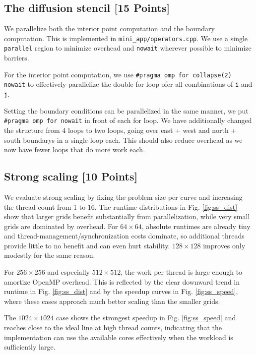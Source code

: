 \documentclass[unicode,10pt,a4paper,oneside,numbers=endperiod,openany]{scrartcl}
\begin{document}
\subsection{The diffusion stencil [15 Points]}\label{sec:diff_par}  We parallelize both the interior point computation and the boundary computation. This is implemented in \texttt{mini\_app/operators.cpp}. We use a single \texttt{parallel} region to minimize overhead and \texttt{nowait} wherever possible to minimize barriers.

For the interior point computation, we use \texttt{\#pragma omp for collapse(2) nowait} to effectively parallelize the double for loop ofer all combinations of \texttt{i} and \texttt{j}.

Setting the boundary conditions can be parallelized in the same manner, we put \texttt{\#pragma omp for nowait} in front of each for loop. We have additionally changed the structure from 4 loops to two loops, going over east + west and north + south boundarys in a single loop each. This should also reduce overhead as we now have fewer loops that do more work each.

\subsection{Strong scaling [10 Points]} We evaluate strong scaling by fixing the problem size per curve and increasing the thread count from 1 to 16. The runtime distributions in Fig. \ref{fig:ss_dist} show that larger grids benefit substantially from parallelization, while very small grids are dominated by overhead. For \(64 \times 64\), absolute runtimes are already tiny and thread-management/synchronization costs dominate, so additional threads provide little to no benefit and can even hurt stability. \(128 \times 128\) improves only modestly for the same reason.

For \(256 \times 256\) and especially \(512 \times 512\), the work per thread is large enough to amortize OpenMP overhead. This is reflected by the clear downward trend in runtime in Fig. \ref{fig:ss_dist} and by the speedup curves in Fig. \ref{fig:ss_speed}, where these cases approach much better scaling than the smaller grids.

The \(1024 \times 1024\) case shows the strongest speedup in Fig. \ref{fig:ss_speed} and reaches close to the ideal line at high thread counts, indicating that the implementation can use the available cores effectively when the workload is sufficiently large.
\end{document}
